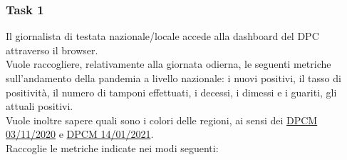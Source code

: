 \subsubsection{Task 1}
\label{sss:cw-task-1}
Il giornalista di testata nazionale/locale accede alla dashboard del DPC attraverso il browser.\\
Vuole raccogliere, relativamente alla giornata odierna, le seguenti metriche sull'andamento della pandemia a livello nazionale: i nuovi positivi, il tasso di positività, il numero di tamponi effettuati, i decessi, i dimessi e i guariti, gli attuali positivi.\\
Vuole inoltre sapere quali sono i colori delle regioni, ai sensi dei \href{https://www.gazzettaufficiale.it/eli/gu/2020/11/04/275/so/41/sg/pdf}{DPCM 03/11/2020} e \href{https://www.gazzettaufficiale.it/eli/id/2021/01/15/21A00221/sg}{DPCM 14/01/2021}.\\
Raccoglie le metriche indicate nei modi seguenti:
